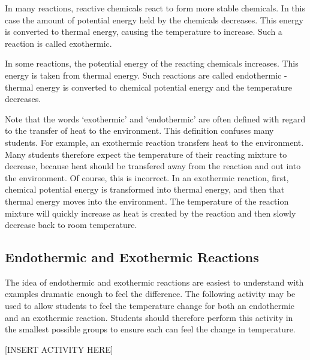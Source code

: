 In many reactions, reactive chemicals react to form more stable chemicals. In this case the amount of potential energy held by the chemicals decreases. This energy is converted to thermal energy, causing the temperature to increase. Such a reaction is called exothermic.

In some reactions, the potential energy of the reacting chemicals increases. This energy is taken from thermal energy. Such reactions are called endothermic - thermal energy is converted to chemical potential energy and the temperature decreases.

Note that the words `exothermic' and `endothermic' are often defined with regard to the transfer of heat to the environment. This definition confuses many students. For example, an exothermic reaction transfers heat to the environment. Many students therefore expect the temperature of their reacting mixture to decrease, because heat should be transfered away from the reaction and out into the environment. Of course, this is incorrect. In an exothermic reaction, first, chemical potential energy is transformed into thermal energy, and then that thermal energy moves into the environment. The temperature of the reaction mixture will quickly increase as heat is created by the reaction and then slowly decrease back to room temperature.

\subsection{Endothermic and Exothermic Reactions}

The idea of endothermic and exothermic reactions are easiest to understand with examples dramatic enough to feel the difference. The following activity may be used to allow students to feel the temperature change for both an endothermic and an exothermic reaction. Students should therefore perform this activity in the smallest possible groups to ensure each can feel the change in temperature.

[INSERT ACTIVITY HERE]
